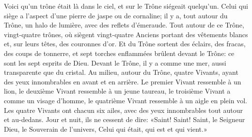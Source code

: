 Voici qu’un trône était là dans le ciel,
	et sur le Trône siégeait quelqu’un.
Celui qui siège a l’aspect d’une pierre de jaspe ou de cornaline;
	il y a, tout autour du Trône,
	un halo de lumière, avec des reflets d’émeraude.
Tout autour de ce Trône, vingt-quatre trônes,
	où siègent vingt-quatre Anciens portant des vêtements blancs
	et, sur leurs têtes, des couronnes d’or.
Et du Trône sortent des éclairs, des fracas, des coups de tonnerre,
	et sept torches enflammées brûlent devant le Trône:
	ce sont les sept esprits de Dieu.
Devant le Trône, il y a comme une mer, aussi transparente que du cristal.
Au milieu, autour du Trône, quatre Vivants,
	ayant des yeux innombrables en avant et en arrière.
Le premier Vivant ressemble à un lion,
	le deuxième Vivant ressemble à un jeune taureau,
	le troisième Vivant a comme un visage d’homme,
	le quatrième Vivant ressemble à un aigle en plein vol.
Les quatre Vivants ont chacun six ailes,
	avec des yeux innombrables tout autour et au-dedans.
Jour et nuit, ils ne cessent de dire:
	«Saint! Saint! Saint, le Seigneur Dieu, le Souverain de l’univers,
	Celui qui était, qui est et qui vient.»
